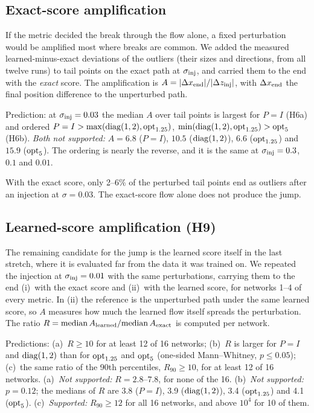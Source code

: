 \subsection{Exact-score amplification}

If the metric decided the break through the flow alone, a fixed perturbation would be amplified most where breaks are common.
We added the measured learned-minus-exact deviations of the outliers (their sizes and directions, from all twelve runs) to tail points on the exact path at $\sigma_{\rm inj}$, and carried them to the end with the \emph{exact} score.
The amplification is $A=|\Delta x_{\rm end}|/|\Delta z_{\rm inj}|$, with $\Delta x_{\rm end}$ the final position difference to the unperturbed path.

\begin{test}
\label{test:h6}
Prediction: at $\sigma_{\rm inj}=0.03$ the median $A$ over tail points is largest for $P=I$ (H6a) and ordered $P=I>\max(\mathrm{diag}(1,2),\mathrm{opt}_{1.25})$, $\min(\mathrm{diag}(1,2),\mathrm{opt}_{1.25})>\mathrm{opt}_{5}$ (H6b).
\emph{Both not supported:} $A=6.8$ ($P=I$), $10.5$ ($\mathrm{diag}(1,2)$), $6.6$ ($\mathrm{opt}_{1.25}$) and $15.9$ ($\mathrm{opt}_{5}$).
The ordering is nearly the reverse, and it is the same at $\sigma_{\rm inj}=0.3$, $0.1$ and $0.01$.
\end{test}

With the exact score, only 2--6\% of the perturbed tail points end as outliers after an injection at $\sigma=0.03$.
The exact-score flow alone does not produce the jump.

\subsection{Learned-score amplification (H9)}
\label{sec:h9}

The remaining candidate for the jump is the learned score itself in the last stretch, where it is evaluated far from the data it was trained on.
We repeated the injection at $\sigma_{\rm inj}=0.01$ with the same perturbations, carrying them to the end (i)~with the exact score and (ii)~with the learned score, for networks 1--4 of every metric.
In (ii) the reference is the unperturbed path under the same learned score, so $A$ measures how much the learned flow itself spreads the perturbation.
The ratio $R=\mathrm{median}\,A_{\rm learned}/\mathrm{median}\,A_{\rm exact}$ is computed per network.

\begin{test}
\label{test:h9}
Predictions: (a)~$R\geq10$ for at least 12 of 16 networks; (b)~$R$ is larger for $P=I$ and $\mathrm{diag}(1,2)$ than for $\mathrm{opt}_{1.25}$ and $\mathrm{opt}_{5}$ (one-sided Mann--Whitney, $p\leq0.05$); (c)~the same ratio of the 90th percentiles, $R_{90}\geq10$, for at least 12 of 16 networks.
(a)~\emph{Not supported:} $R=2.8$--$7.8$, for none of the 16.
(b)~\emph{Not supported:} $p=0.12$; the medians of $R$ are 3.8 ($P=I$), 3.9 ($\mathrm{diag}(1,2)$), 3.4 ($\mathrm{opt}_{1.25}$) and 4.1 ($\mathrm{opt}_{5}$).
(c)~\emph{Supported:} $R_{90}\geq12$ for all 16 networks, and above $10^4$ for 10 of them.
\end{test}

